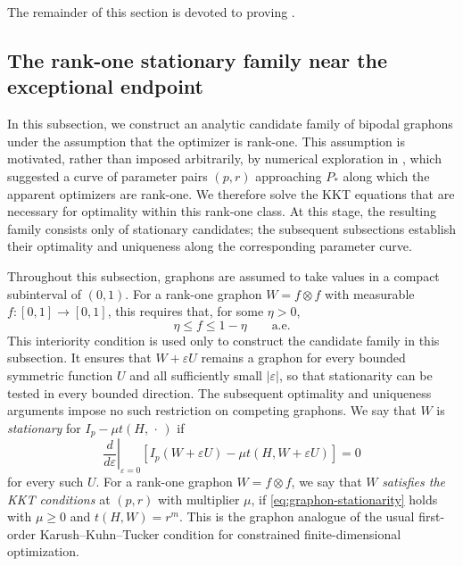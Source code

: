 The remainder of this section is devoted to proving
.

\subsection{The rank-one stationary family near the exceptional endpoint}
\label{sec:rank-one-stationary-family}

In this subsection, we construct an analytic candidate family of bipodal
graphons under the assumption that the optimizer is rank-one.
This assumption is motivated, rather than imposed arbitrarily, by numerical
exploration in , which suggested a curve of parameter pairs $(p,r)$
approaching $P_*$ along which the apparent optimizers are rank-one.
We therefore solve the KKT equations that are necessary for optimality within
this rank-one class.  At this stage, the resulting family consists only of stationary
candidates; the subsequent subsections establish their optimality and
uniqueness along the corresponding parameter curve.

Throughout this subsection, graphons are assumed to take values in a compact
subinterval of $(0,1)$.  For a rank-one graphon $W=f\otimes f$ with
measurable $f:[0,1]\to[0,1]$, this requires that, for some $\eta>0$,
\[
  \eta\le f\le1-\eta
  \qquad\text{a.e.}
\]
This interiority condition is used only to construct the candidate family in
this subsection.  It ensures that $W+\varepsilon U$ remains a graphon for every
bounded symmetric function $U$ and all sufficiently small $|\varepsilon|$, so
that stationarity can be tested in every bounded direction.  The subsequent
optimality and uniqueness arguments impose no such restriction on competing
graphons.  We say that $W$ is \emph{stationary} for
$I_p-\mu t(H,\,\cdot\,)$ if
\begin{equation}\label{eq:graphon-stationarity}
  \left.\frac{d}{d\varepsilon}\right|_{\varepsilon=0}
  \left[
    I_p(W+\varepsilon U)
    -\mu t(H,W+\varepsilon U)
  \right]=0
\end{equation}
for every such $U$.
For a rank-one graphon $W=f\otimes f$, we say that $W$ \emph{satisfies the
KKT conditions} at $(p,r)$ with multiplier $\mu$, if \eqref{eq:graphon-stationarity}
holds with $\mu\ge0$ and $t(H,W)=r^m$.  This is the graphon
analogue of the usual first-order Karush--Kuhn--Tucker condition for
constrained finite-dimensional optimization.

